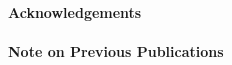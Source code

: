 {\Large{\bf{Acknowledgements}}} \\

\lipsum  \leavevmode \\ 

{\Large{\bf{Note on Previous Publications}}} \\

\begin{enumerate}[label={[\arabic*]}]
\item 
\item 
\item
\end{enumerate}
